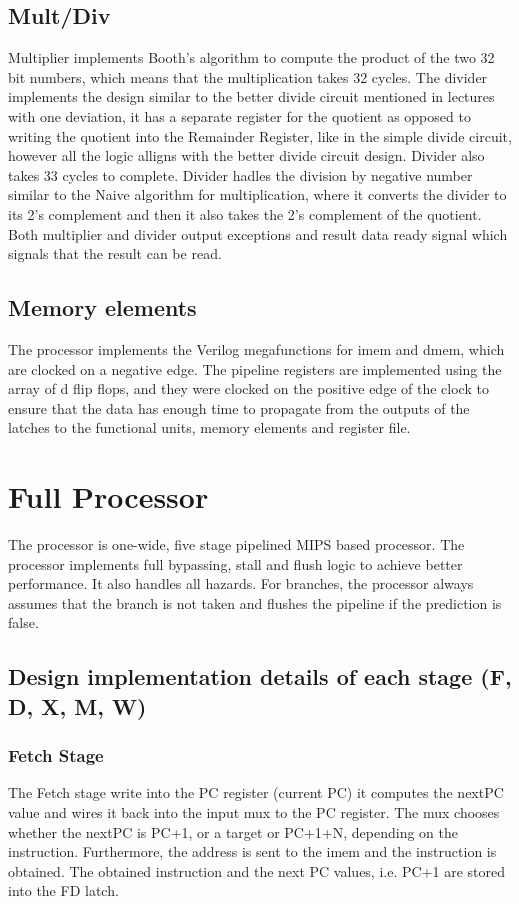 \documentclass{article}
\begin{document}
\subsection{Mult/Div}
Multiplier implements Booth's algorithm to compute the product of the two 32 bit numbers, which means that the multiplication takes 32 cycles. The divider implements the design similar to the better divide circuit mentioned in lectures with one deviation, it has a separate register for the quotient as opposed to writing the quotient into the Remainder Register, like in the simple divide circuit, however all the logic alligns with the better divide circuit design. Divider also takes 33 cycles to complete. Divider hadles the division by negative number similar to the Naive algorithm for multiplication, where it converts the divider to its 2's complement and then it also takes the 2's complement of the quotient. Both multiplier and divider output exceptions and result data ready signal which signals that the result can be read.

\subsection{Memory elements}
The processor implements the Verilog megafunctions for imem and dmem, which are clocked on a negative edge.
The pipeline registers are implemented using the array of d flip flops, and they were clocked on the positive edge of the clock to ensure that the data has enough time to propagate from the outputs of the latches to the functional units, memory elements and register file.

\section{Full Processor}
The processor is one-wide, five stage pipelined MIPS based processor. The processor implements full bypassing, stall and flush logic to achieve better performance. It also handles all hazards. For branches, the processor always assumes that the branch is not taken and flushes the pipeline if the prediction is false.

\subsection{Design implementation details of each stage (F, D, X, M, W)}
\subsubsection{Fetch Stage}
The Fetch stage write into the PC register (current PC) it computes the nextPC value and wires it back into the input mux to the PC register. The mux chooses whether the nextPC is PC+1, or a target or PC+1+N, depending on the instruction. Furthermore, the address is sent to the imem and the instruction is obtained. The obtained instruction and the next PC values, i.e. PC+1 are stored into the  FD latch.
\end{document}
